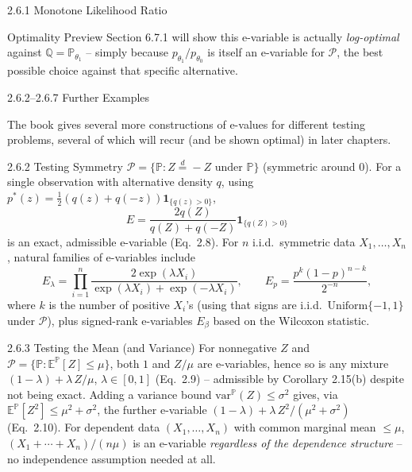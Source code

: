 \documentclass[aspectratio=169,10pt]{beamer}
\newcommand{\PP}{\mathbb{P}}
\newcommand{\QQ}{\mathbb{Q}}
\newcommand{\EE}{\mathbb{E}}
\newcommand{\calP}{\mathcal{P}}
\newcommand{\ind}[1]{\mathbf{1}_{\{#1\}}}
\begin{document}
\begin{frame}[allowframebreaks]{2.6.1 Monotone Likelihood Ratio}
  \begin{alertblock}{Optimality Preview}
    Section 6.7.1 will show this e-variable is actually \emph{log-optimal}
    against $\QQ=\PP_{\theta_1}$ -- simply because $p_{\theta_1}/p_{\theta_0}$
    is itself an e-variable for $\calP$, the best possible choice against
    that specific alternative.
  \end{alertblock}

\end{frame}

\begin{frame}[allowframebreaks]{2.6.2--2.6.7 Further Examples}

The book gives several more constructions of e-values for different testing
problems, several of which will recur (and be shown optimal) in later
chapters.

  \begin{block}{2.6.2 Testing Symmetry}
    $\calP = \{\PP: Z \stackrel{d}{=} -Z \text{ under } \PP\}$ (symmetric
    around 0). For a single observation with alternative density $q$, using
    $p^*(z)=\tfrac12(q(z)+q(-z))\ind{q(z)>0}$,
    \[
      E = \frac{2q(Z)}{q(Z)+q(-Z)}\ind{q(Z)>0}
    \]
    is an exact, admissible e-variable (Eq.~2.8). For $n$ i.i.d.\ symmetric
    data $X_1,\ldots,X_n$, natural families of e-variables include
    \[
      E_\lambda = \prod_{i=1}^n \frac{2\exp(\lambda X_i)}{\exp(\lambda X_i)+\exp(-\lambda X_i)},\qquad
      E_p = \frac{p^{k}(1-p)^{n-k}}{2^{-n}},
    \]
    where $k$ is the number of positive $X_i$'s (using that signs are i.i.d.\
    $\mathrm{Uniform}\{-1,1\}$ under $\calP$), plus signed-rank e-variables
    $E_\beta$ based on the Wilcoxon statistic.
  \end{block}

  \begin{block}{2.6.3 Testing the Mean (and Variance)}
    For nonnegative $Z$ and $\calP=\{\PP:\EE^\PP[Z]\le\mu\}$, both $1$ and
    $Z/\mu$ are e-variables, hence so is any mixture
    $(1-\lambda) + \lambda\, Z/\mu$, $\lambda\in[0,1]$ (Eq.~2.9) --
    admissible by Corollary 2.15(b) despite not being exact. Adding a
    variance bound $\mathrm{var}^\PP(Z)\le\sigma^2$ gives, via
    $\EE^\PP[Z^2]\le\mu^2+\sigma^2$, the further e-variable
    $(1-\lambda)+\lambda\,Z^2/(\mu^2+\sigma^2)$ (Eq.~2.10). For dependent
    data $(X_1,\ldots,X_n)$ with common marginal mean $\le\mu$,
    $(X_1+\cdots+X_n)/(n\mu)$ is an e-variable \emph{regardless of the
    dependence structure} -- no independence assumption needed at all.
  \end{block}


\end{frame}
\end{document}
